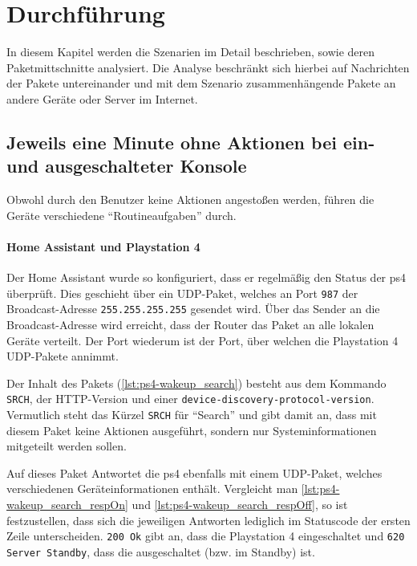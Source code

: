 \newpage
\section{Durchführung}\label{sec:durchfuehrung}
In diesem Kapitel werden die Szenarien im Detail beschrieben,
sowie deren Paketmittschnitte analysiert.
Die Analyse beschränkt sich hierbei auf Nachrichten der Pakete untereinander
und mit dem Szenario zusammenhängende Pakete an andere Geräte oder Server im Internet.


\subsection{Jeweils eine Minute ohne Aktionen bei ein- und ausgeschalteter Konsole}
Obwohl durch den Benutzer keine Aktionen angestoßen werden,
führen die Geräte verschiedene \enquote{Routineaufgaben} durch.

\paragraph{Home Assistant und Playstation 4}
Der Home Assistant wurde so konfiguriert,
dass er regelmäßig den Status der \ac{ps4} überprüft.
Dies geschieht über ein UDP-Paket,
welches an Port \texttt{987} der Broadcast-Adresse \texttt{255.255.255.255} gesendet wird.
Über das Sender an die Broadcast-Adresse wird erreicht,
dass der Router das Paket an alle lokalen Geräte verteilt.
Der Port wiederum ist der Port, über welchen die Playstation 4 UDP-Pakete annimmt.


Der Inhalt des Pakets (\autoref{lst:ps4-wakeup_search}) besteht aus dem Kommando \texttt{SRCH},
der HTTP-Version und einer \texttt{device-discovery-protocol-version}.
Vermutlich steht das Kürzel \texttt{SRCH} für \enquote{Search} und gibt damit an,
dass mit diesem Paket keine Aktionen ausgeführt,
sondern nur Systeminformationen mitgeteilt werden sollen.



Auf dieses Paket Antwortet die \ac{ps4} ebenfalls mit einem UDP-Paket,
welches verschiedenen Geräteinformationen enthält.
Vergleicht man \autoref{lst:ps4-wakeup_search_respOn} und \autoref{lst:ps4-wakeup_search_respOff},
so ist festzustellen,
dass sich die jeweiligen Antworten lediglich im Statuscode der ersten Zeile unterscheiden.
\texttt{200 Ok} gibt an, dass die Playstation 4 eingeschaltet und \texttt{620 Server Standby},
dass die ausgeschaltet (bzw. im Standby) ist.

